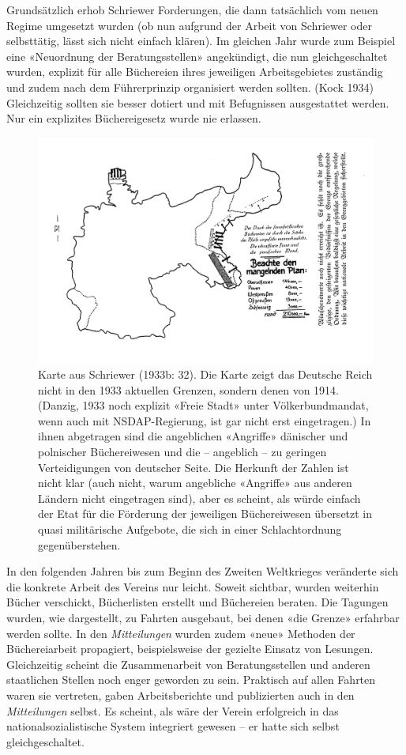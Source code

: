 \documentclass[a4paper,
fontsize=11pt,
oneside,
numbers=noperiodatend,
parskip=half-,
bibliography=totoc,
final
]{scrartcl}
\begin{document}
Grundsätzlich erhob Schriewer Forderungen, die dann tatsächlich vom
neuen Regime umgesetzt wurden (ob nun aufgrund der Arbeit von Schriewer
oder selbsttätig, lässt sich nicht einfach klären). Im gleichen Jahr
wurde zum Beispiel eine «Neuordnung der Beratungsstellen» angekündigt,
die nun gleichgeschaltet wurden, explizit für alle Büchereien ihres
jeweiligen Arbeitsgebietes zuständig und zudem nach dem Führerprinzip
organisiert werden sollten. (Kock 1934) Gleichzeitig sollten sie besser
dotiert und mit Befugnissen ausgestattet werden. Nur ein explizites
Büchereigesetz wurde nie erlassen.

\begin{figure}
\centering
\includegraphics{img/karte_angriffe.jpg}
\caption{Karte aus Schriewer (1933b: 32). Die Karte zeigt das Deutsche
Reich nicht in den 1933 aktuellen Grenzen, sondern denen von 1914.
(Danzig, 1933 noch explizit «Freie Stadt» unter Völkerbundmandat, wenn
auch mit NSDAP-Regierung, ist gar nicht erst eingetragen.) In ihnen
abgetragen sind die angeblichen «Angriffe» dänischer und polnischer
Büchereiwesen und die -- angeblich -- zu geringen Verteidigungen von
deutscher Seite. Die Herkunft der Zahlen ist nicht klar (auch nicht,
warum angebliche «Angriffe» aus anderen Ländern nicht eingetragen sind),
aber es scheint, als würde einfach der Etat für die Förderung der
jeweiligen Büchereiwesen übersetzt in quasi militärische Aufgebote, die
sich in einer Schlachtordnung gegenüberstehen.}
\end{figure}

In den folgenden Jahren bis zum Beginn des Zweiten Weltkrieges
veränderte sich die konkrete Arbeit des Vereins nur leicht. Soweit
sichtbar, wurden weiterhin Bücher verschickt, Bücherlisten erstellt und
Büchereien beraten. Die Tagungen wurden, wie dargestellt, zu Fahrten
ausgebaut, bei denen «die Grenze» erfahrbar werden sollte. In den
\emph{Mitteilungen} wurden zudem «neue» Methoden der Büchereiarbeit
propagiert, beispielsweise der gezielte Einsatz von Lesungen.
Gleichzeitig scheint die Zusammenarbeit von Beratungsstellen und anderen
staatlichen Stellen noch enger geworden zu sein. Praktisch auf allen
Fahrten waren sie vertreten, gaben Arbeitsberichte und publizierten auch
in den \emph{Mitteilungen} selbst. Es scheint, als wäre der Verein
erfolgreich in das nationalsozialistische System integriert gewesen --
er hatte sich selbst gleichgeschaltet.
\end{document}
